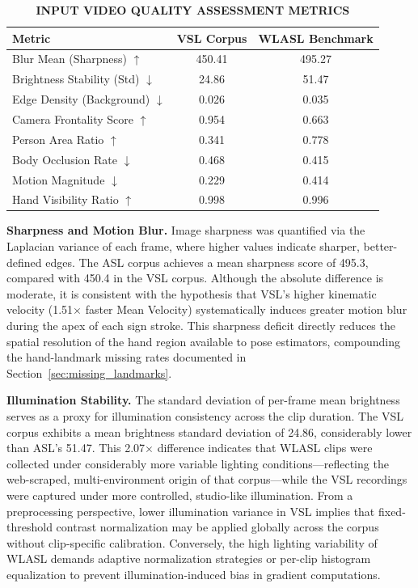 \documentclass{ieeeaccess}
\begin{document}
\begin{table}[htbp]
\caption{\textbf{INPUT VIDEO QUALITY ASSESSMENT METRICS}}
\centering
\setlength{\tabcolsep}{3pt}
\begin{tabular}{|l|c|c|}
\hline
\textbf{Metric} & \textbf{VSL Corpus} & \textbf{WLASL Benchmark} \\
\hline
Blur Mean (Sharpness) $\uparrow$ & 450.41 & 495.27 \\
Brightness Stability (Std) $\downarrow$ & 24.86 & 51.47 \\
Edge Density (Background) $\downarrow$ & 0.026 & 0.035 \\
Camera Frontality Score $\uparrow$ & 0.954 & 0.663 \\
Person Area Ratio $\uparrow$ & 0.341 & 0.778 \\
Body Occlusion Rate $\downarrow$ & 0.468 & 0.415 \\
Motion Magnitude $\downarrow$ & 0.229 & 0.414 \\
Hand Visibility Ratio $\uparrow$ & 0.998 & 0.996 \\
\hline
\end{tabular}
\label{tab:quality}
\end{table}

\textbf{Sharpness and Motion Blur.} Image sharpness was quantified via the Laplacian variance of each frame, where higher values indicate sharper, better-defined edges. The ASL corpus achieves a mean sharpness score of 495.3, compared with 450.4 in the VSL corpus. Although the absolute difference is moderate, it is consistent with the hypothesis that VSL's higher kinematic velocity (1.51$\times$ faster Mean Velocity) systematically induces greater motion blur during the apex of each sign stroke. This sharpness deficit directly reduces the spatial resolution of the hand region available to pose estimators, compounding the hand-landmark missing rates documented in Section~\ref{sec:missing_landmarks}.

\textbf{Illumination Stability.} The standard deviation of per-frame mean brightness serves as a proxy for illumination consistency across the clip duration. The VSL corpus exhibits a mean brightness standard deviation of 24.86, considerably lower than ASL's 51.47. This 2.07$\times$ difference indicates that WLASL clips were collected under considerably more variable lighting conditions—reflecting the web-scraped, multi-environment origin of that corpus—while the VSL recordings were captured under more controlled, studio-like illumination. From a preprocessing perspective, lower illumination variance in VSL implies that fixed-threshold contrast normalization may be applied globally across the corpus without clip-specific calibration. Conversely, the high lighting variability of WLASL demands adaptive normalization strategies or per-clip histogram equalization to prevent illumination-induced bias in gradient computations.
\end{document}
